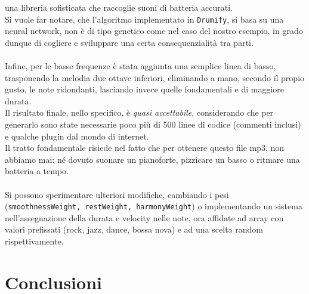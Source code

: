 \documentclass[a4paper,12pt]{report}
\begin{document}
una libreria sofisticata che raccoglie suoni di batteria accurati. \\
Si vuole far notare, che l'algoritmo implementato in \texttt{Drumify}, si basa su una neural network, non è di tipo genetico come nel caso del nostro esempio, in grado dunque di cogliere e sviluppare una certa consequenzialità tra parti. \\
\\
Infine, per le basse frequenze è stata aggiunta una semplice linea di basso, trasponendo la melodia due ottave inferiori, eliminando a mano, secondo il propio gusto, le note ridondanti, lasciando invece quelle fondamentali e di maggiore durata. \\
Il risultato finale, nello specifico, è \textit{quasi accettabile}, considerando che per generarlo sono state necessarie poco più di 500 linee di codice (commenti inclusi) e qualche plugin dal mondo di internet. \\
Il tratto fondamentale risiede nel fatto che per ottenere questo file mp3, non abbiamo mai: né dovuto suonare un pianoforte, pizzicare un basso o ritmare una batteria a tempo. \\
\\
Si possono sperimentare ulteriori modifiche, cambiando i pesi (\texttt{smoothnessWeight, restWeight, harmonyWeight}) o implementando un sistema nell'assegnazione della durata e velocity nelle note, ora affidate ad array con valori prefissati (rock, jazz, dance, bossa nova) e ad una scelta random rispettivamente.

\chapter{Conclusioni}
\end{document}
